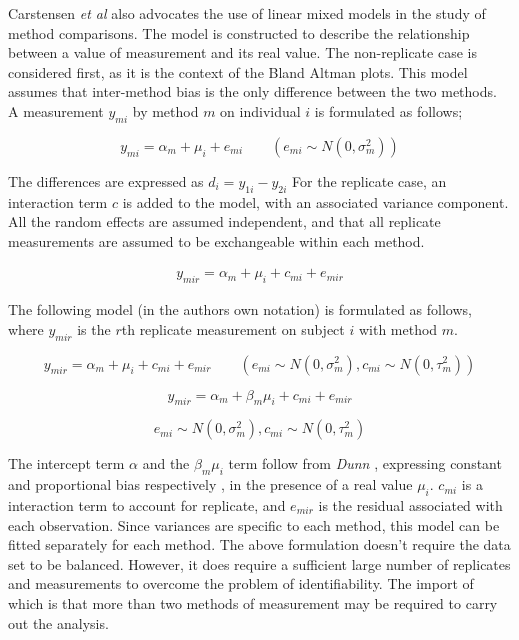 \documentclass[12pt, a4paper]{report}
\theoremstyle{plain}
\theoremstyle{definition}
\theoremstyle{remark}
\begin{document}
%


Carstensen \textit{et al} \cite{BXC2004} also advocates the use of linear mixed models in
the study of method comparisons. 
The model is constructed to
describe the relationship between a value of measurement and its
real value.
The non-replicate case is considered first, as it is
the context of the Bland Altman plots. This model assumes that
inter-method bias is the only difference between the two methods.
A measurement $y_{mi}$ by method $m$ on individual $i$ is
formulated as follows;

\begin{equation}
y_{mi}  = \alpha_{m} + \mu_{i} + e_{mi} \qquad ( e_{mi} \sim
N(0,\sigma^{2}_{m}))
\end{equation}


%


The differences are expressed as $d_{i} = y_{1i} - y_{2i}$ For the
replicate case, an interaction term $c$ is added to the model,
with an associated variance component. 
All the random effects are
assumed independent, and that all replicate measurements are
assumed to be exchangeable within each method.

\begin{eqnarray}
y_{mir}  = \alpha_{m} + \mu_{i} + c_{mi} + e_{mir} 
\end{eqnarray}

%



The following model (in the authors own notation) is
formulated as follows, where $y_{mir}$ is the $r$th replicate
measurement on subject $i$ with method $m$.

{
	
	\begin{equation}
	y_{mir}  = \alpha_{m} + \mu_{i} + c_{mi} + e_{mir} \qquad ( e_{mi}
	\sim N(0,\sigma^{2}_{m}), c_{mi} \sim N(0,\tau^{2}_{m}))
	\end{equation}
	
	
	\begin{equation}
	y_{mir}  = \alpha_{m} + \beta_{m}\mu_{i} + c_{mi} + e_{mir} 
	\end{equation}
	
	\[ e_{mi} \sim N(0,\sigma^{2}_{m}), c_{mi} \sim N(0,\tau^{2}_{m})\]
}

The intercept term $\alpha$ and the $\beta_{m}\mu_{i}$ term follow
from \textit{Dunn} \cite{DunnSEME}, expressing constant and proportional bias
respectively , in the presence of a real value $\mu_{i}.$
$c_{mi}$ is a interaction term to account for replicate, and
$e_{mir}$ is the residual associated with each observation.
Since variances are specific to each method, this model can be
fitted separately for each method.
The above formulation doesn't require the data set to be balanced.
However, it does require a sufficient large number of replicates
and measurements to overcome the problem of identifiability. 
The
import of which is that more than two methods of measurement may
be required to carry out the analysis. 
\end{document}
